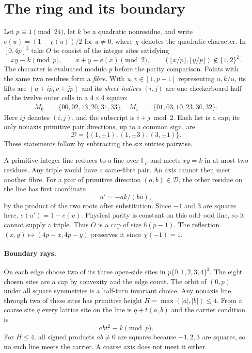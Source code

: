 \documentclass[11pt]{article}
\newcommand{\F}{\mathbb F_p}\newcommand{\Z}{\mathbb Z}\newcommand{\B}{\mathcal B}\newcommand{\D}{\mathcal D}\newcommand{\A}{\mathcal A}\newcommand{\ch}{\chi}\newcommand{\eps}{\varepsilon}
\begin{document}
\section{The ring and its boundary}
Let $p\equiv1\pmod{24}$, let $k$ be a quadratic nonresidue, and write $e(u)=(1-\ch(u))/2$ for $u\ne0$, where $\ch$ denotes the quadratic character. In $[0,4p]^2$ take $O$ to consist of the integer sites satisfying
\[
 xy\equiv k\pmod p,\qquad x+y\equiv e(x)\pmod2,\qquad (\lfloor x/p\rfloor,\lfloor y/p\rfloor)\notin\{1,2\}^2.
\]
The character is evaluated modulo $p$ before the parity comparison. Points with the same two residues form a \emph{fibre}. With $u,v\in[1,p-1]$ representing $u,k/u$, its lifts are $(u+ip,v+jp)$ and its \emph{sheet indices} $(i,j)$ are one checkerboard half of the twelve outer cells in a $4\times4$ square:
\begin{align*}
 M_0&=\{00,02,13,20,31,33\}, & M_1&=\{01,03,10,23,30,32\}.
\end{align*}
Here $ij$ denotes $(i,j)$, and the subscript is $i+j\bmod2$. Each list is a cap; its only nonaxis primitive pair directions, up to a common sign, are
\[
 \D=\{(1,\pm1),(1,\pm3),(3,\pm1)\}.                 \tag{1}
\]
These statements follow by subtracting the six entries pairwise.

A primitive integer line reduces to a line over $\F$ and meets $xy=k$ in at most two residues. Any triple would have a same-fibre pair. An axis cannot then meet another fibre. For a pair of primitive direction $(a,b)\in\D$, the other residue on the line has first coordinate
\[
 u'=-ak/(bu),                                             \tag{2}
\]
by the product of the two roots after substitution. Since $-1$ and $3$ are squares here, $e(u')=1-e(u)$. Physical parity is constant on this odd--odd line, so it cannot supply a triple. Thus $O$ is a cap of size $6(p-1)$. The reflection $(x,y)\mapsto(4p-x,4p-y)$ preserves it since $\ch(-1)=1$.

\paragraph{Boundary rays.} On each edge choose two of its three open-side sites in $p\{0,1,2,3,4\}^2$. The eight chosen sites are a cap by convexity and the edge count. The orbit of $(0,p)$ under all square symmetries is a half-turn invariant choice. Any nonaxis line through two of these sites has primitive height $H=\max(|a|,|b|)\le4$. From a coarse site $q$ every lattice site on the line is $q+t(a,b)$ and the carrier condition is
\[
                         abt^2\equiv k\pmod p.             \tag{3}
\]
For $H\le4$, all signed products $ab\ne0$ are squares because $-1,2,3$ are squares, so no such line meets the carrier. A coarse axis does not meet it either.
\end{document}
